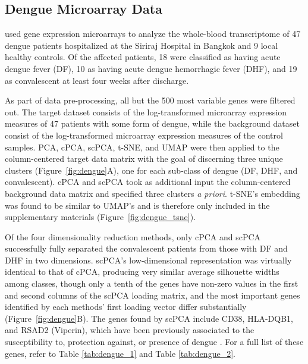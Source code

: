 \subsection{Dengue Microarray Data}\label{dengue_data}

\citet{Kwissa2014} used gene expression microarrays to analyze the whole-blood transcriptome of 47 dengue patients hospitalized at the Siriraj Hospital in Bangkok and 9 local healthy controls. Of the affected patients, 18 were classified as having acute dengue fever (DF), 10 as having acute dengue hemorrhagic fever (DHF), and 19 as convalescent at least four weeks after discharge.

As part of data pre-processing, all but the 500 most variable genes were filtered out. The target dataset consists of the log-transformed microarray expression measures of 47 patients with some form of dengue, while the background dataset consist of the log-transformed microarray expression measures of the control samples. PCA, cPCA, scPCA, t-SNE, and UMAP were then applied to the column-centered target data matrix with the goal of discerning three unique clusters (Figure~\ref{fig:dengue}A), one for each sub-class of dengue (DF, DHF, and convalescent). cPCA and scPCA took as additional input the column-centered background data matrix and specified three clusters \textit{a priori}. t-SNE's embedding was found to be similar to UMAP's and is therefore only included in the supplementary materials (Figure~\ref{fig:dengue_tsne}).

Of the four dimensionality reduction methods, only cPCA and scPCA successfully fully separated the convalescent patients from those with DF and DHF in two dimensions. scPCA's low-dimensional representation was virtually identical to that of cPCA, producing very similar average silhouette widths among classes, though only a tenth of the genes have non-zero values in the first and second columns of the scPCA loading matrix, and the most important genes identified by each methods' first loading vector differ substantially (Figure~\ref{fig:dengue}B). The genes found by scPCA include CD38, HLA-DQB1, and RSAD2 (Viperin), which have been previously associated to the susceptibility to, protection against, or presence of dengue \citep{Castaneda2016,Cardozo2014,Fitzgerald2011}. For a full list of these genes, refer to Table \ref{tab:dengue_1} and Table \ref{tab:dengue_2}. 

